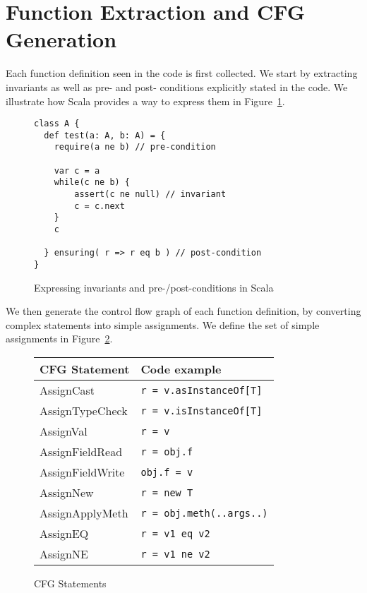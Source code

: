 \section{Function Extraction and CFG Generation}

Each function definition seen in the code is first collected. We start by
extracting invariants as well as pre- and post- conditions explicitly stated in
the code. We illustrate how Scala provides a way to express them in
Figure~\ref{fig:fe:example1}.

\begin{figure}[h]
    \centering
\begin{lstlisting}
class A {
  def test(a: A, b: A) = {
    require(a ne b) // pre-condition

    var c = a
    while(c ne b) {
        assert(c ne null) // invariant
        c = c.next
    }
    c

  } ensuring( r => r eq b ) // post-condition
}
\end{lstlisting}
    \caption{Expressing invariants and pre-/post-conditions in Scala}
    \label{fig:fe:example1}
\end{figure}

We then generate the control flow graph of each function definition, by converting
complex statements into simple assignments. We define the set of
simple assignments in Figure~\ref{fig:cfg:statements}.

\FloatBarrier
\begin{figure}[h]
    \centering

    \begin{tabular}{ l | l }
        CFG Statement               & Code example \\
        \hline
        AssignCast       & \verb/r = v.asInstanceOf[T]/  \\
        AssignTypeCheck  & \verb/r = v.isInstanceOf[T]/  \\
        AssignVal        & \verb/r = v/  \\
        AssignFieldRead  & \verb/r = obj.f/  \\
        AssignFieldWrite & \verb/obj.f = v/  \\
        AssignNew        & \verb/r = new T/  \\
        AssignApplyMeth  & \verb/r = obj.meth(..args..)/  \\
        AssignEQ         & \verb/r = v1 eq v2/  \\
        AssignNE         & \verb/r = v1 ne v2/  \\
    \end{tabular}

    \caption{CFG Statements}
    \label{fig:cfg:statements}
\end{figure}

